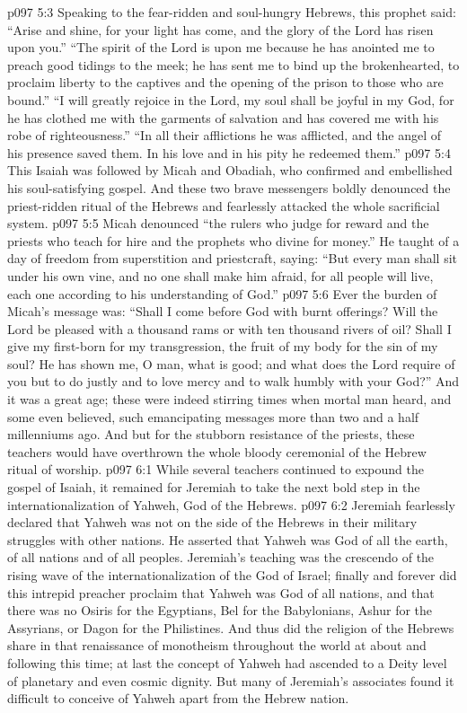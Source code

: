 \vs p097 5:3 Speaking to the fear\hyp{}ridden and soul\hyp{}hungry Hebrews, this prophet said: “Arise and shine, for your light has come, and the glory of the Lord has risen upon you.” “The spirit of the Lord is upon me because he has anointed me to preach good tidings to the meek; he has sent me to bind up the brokenhearted, to proclaim liberty to the captives and the opening of the prison to those who are bound.” “I will greatly rejoice in the Lord, my soul shall be joyful in my God, for he has clothed me with the garments of salvation and has covered me with his robe of righteousness.” “In all their afflictions he was afflicted, and the angel of his presence saved them. In his love and in his pity he redeemed them.”
\vs p097 5:4 \pc This Isaiah was followed by Micah and Obadiah, who confirmed and embellished his soul\hyp{}satisfying gospel. And these two brave messengers boldly denounced the priest\hyp{}ridden ritual of the Hebrews and fearlessly attacked the whole sacrificial system.
\vs p097 5:5 Micah denounced “the rulers who judge for reward and the priests who teach for hire and the prophets who divine for money.” He taught of a day of freedom from superstition and priestcraft, saying: “But every man shall sit under his own vine, and no one shall make him afraid, for all people will live, each one according to his understanding of God.”
\vs p097 5:6 Ever the burden of Micah’s message was: “Shall I come before God with burnt offerings? Will the Lord be pleased with a thousand rams or with ten thousand rivers of oil? Shall I give my first\hyp{}born for my transgression, the fruit of my body for the sin of my soul? He has shown me, O man, what is good; and what does the Lord require of you but to do justly and to love mercy and to walk humbly with your God?” And it was a great age; these were indeed stirring times when mortal man heard, and some even believed, such emancipating messages more than two and a half millenniums ago. And but for the stubborn resistance of the priests, these teachers would have overthrown the whole bloody ceremonial of the Hebrew ritual of worship.
\vs p097 6:1 While several teachers continued to expound the gospel of Isaiah, it remained for Jeremiah to take the next bold step in the internationalization of Yahweh, God of the Hebrews.
\vs p097 6:2 Jeremiah fearlessly declared that Yahweh was not on the side of the Hebrews in their military struggles with other nations. He asserted that Yahweh was God of all the earth, of all nations and of all peoples. Jeremiah’s teaching was the crescendo of the rising wave of the internationalization of the God of Israel; finally and forever did this intrepid preacher proclaim that Yahweh was God of all nations, and that there was no Osiris for the Egyptians, Bel for the Babylonians, Ashur for the Assyrians, or Dagon for the Philistines. And thus did the religion of the Hebrews share in that renaissance of monotheism throughout the world at about and following this time; at last the concept of Yahweh had ascended to a Deity level of planetary and even cosmic dignity. But many of Jeremiah’s associates found it difficult to conceive of Yahweh apart from the Hebrew nation.
